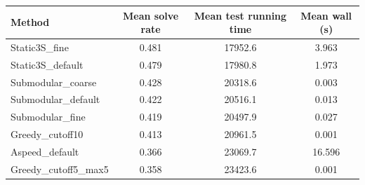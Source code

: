\begin{tabular}{lccc}
\toprule
Method & Mean solve rate & Mean test running time & Mean wall (s) \\

\midrule
Static3S\_fine & 0.481 & 17952.6 & 3.963 \\
Static3S\_default & 0.479 & 17980.8 & 1.973 \\
Submodular\_coarse & 0.428 & 20318.6 & 0.003 \\
Submodular\_default & 0.422 & 20516.1 & 0.013 \\
Submodular\_fine & 0.419 & 20497.9 & 0.027 \\
Greedy\_cutoff10 & 0.413 & 20961.5 & 0.001 \\
Aspeed\_default & 0.366 & 23069.7 & 16.596 \\
Greedy\_cutoff5\_max5 & 0.358 & 23423.6 & 0.001 \\
\bottomrule
\end{tabular}
